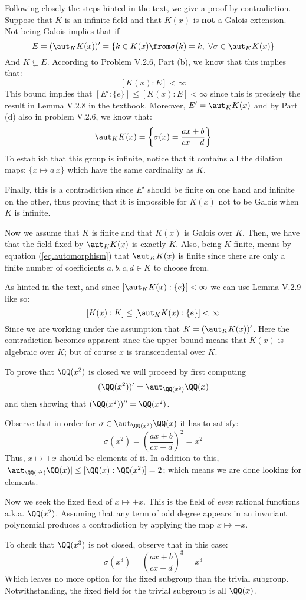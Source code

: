 Following closely the steps hinted in the text, we give a proof by contradiction. Suppose that $K$ is an infinite field and that $K(x)$ is \textbf{not }a Galois extension. Not being Galois implies that if 
$$E=(\aut_KK(x))'= \{ k \in K(x) \from  \sigma(k)=k, \ \forall \sigma \in \aut_KK(x) \} $$ 
And $K\subsetneq E$. According to Problem V.2.6, Part (b), we know that this implies that:
$$[K(x):E] <\infty$$
This bound implies that $[E':\{e\}]\leq [K(x):E]<\infty $ since this is precisely the result in Lemma V.2.8 in the textbook. Moreover, $E'= \aut_K K(x)$ and by Part (d) also in problem V.2.6, we know that:
\begin{equation}\label{eq.automorphism}
\aut_K K(x) = \left\{ \sigma(x) = \frac{ax+b}{cx+d}\right \}
\end{equation}
To establish that this group is infinite, notice that it contains all the dilation maps: $\{x\mapsto a\,x\}$ which have the same cardinality as $K$. 

Finally, this is a contradiction since $E'$ should be finite on one hand and infinite on the other, thus proving that it is impossible for $K(x)$ not to be Galois when $K$ is infinite.

Now we assume that $K$ is finite and that $K(x)$ is Galois over $K$. Then, we have that the field fixed by $\aut_K K(x)$ is exactly $K$. Also, being $K$ finite, means by equation (\ref{eq.automorphism}) that $\aut_K K(x)$ is finite since there are only  a finite number of coefficients $a,b,c,d\in K$ to choose from. 

As hinted in the text, and since $[\aut_K K(x):\{e\}]<\infty$ we can use Lemma V.2.9 like so:
$$[K(x):K] \leq [\aut_K K(x):\{e\}]<\infty$$
Since we are working under the assumption that $K = (\aut_K K(x))'$. Here the contradiction becomes apparent since the upper bound means that $K(x)$ is algebraic over $K$; but of course $x$ is transcendental over $K$.

To prove that $\QQ(x^2)$ is closed we will proceed by first computing 
$$(\QQ(x^2))'= \aut_{\QQ(x^2)}\QQ(x)$$
and then showing that $(\QQ(x^2))'' = \QQ(x^2)$.

Observe that in order for $\sigma \in \aut_{\QQ(x^2)}\QQ(x)$ it has to satisfy:
$$\sigma(x^2) = \left( \frac{ax+b}{cx+d}\right)^2=x^2$$
Thus, $x\mapsto \pm x$ should be elements of it. In addition to this, $|\aut_{\QQ(x^2)}\QQ(x)|\leq [\QQ(x):\QQ(x^2)]=2$; which means we are done looking for elements. 

Now we seek the fixed field of $x\mapsto \pm x$. This is the field of \emph{even} rational functions a.k.a. $\QQ(x^2)$. Assuming that any term of odd degree appears in an invariant polynomial produces a contradiction by applying the map $x\mapsto -x$.

To check that $\QQ(x^3)$ is not closed, observe that in this case:
$$\sigma(x^3) = \left( \frac{ax+b}{cx+d}\right)^3=x^3$$
Which leaves no more option for the fixed subgroup than the trivial subgroup. Notwithstanding, the fixed field for the trivial subgroup is all $\QQ(x)$.

